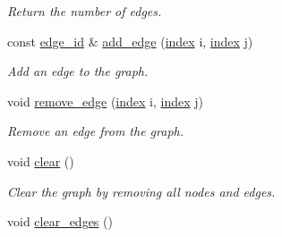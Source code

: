 \begin{DoxyCompactItemize}
\begin{DoxyCompactList}\small\item\em Return the number of edges. \end{DoxyCompactList}\item 
const \hyperlink{structmerlin_1_1edge__id}{edge\+\_\+id} \& \hyperlink{classmerlin_1_1graph_abb6ac50bdc67b24c70ac9cb896475350}{add\+\_\+edge} (\hyperlink{classmerlin_1_1graph_a5cade38832f47248573e921276f122d6}{index} i, \hyperlink{classmerlin_1_1graph_a5cade38832f47248573e921276f122d6}{index} j)
\begin{DoxyCompactList}\small\item\em Add an edge to the graph. \end{DoxyCompactList}\item 
void \hyperlink{classmerlin_1_1graph_a1d17b17fbf5b8378c1d65b885e688897}{remove\+\_\+edge} (\hyperlink{classmerlin_1_1graph_a5cade38832f47248573e921276f122d6}{index} i, \hyperlink{classmerlin_1_1graph_a5cade38832f47248573e921276f122d6}{index} j)
\begin{DoxyCompactList}\small\item\em Remove an edge from the graph. \end{DoxyCompactList}\item 
\hypertarget{classmerlin_1_1graph_a1971a84f3b1b32af0a4eeff502c491e3}{}void \hyperlink{classmerlin_1_1graph_a1971a84f3b1b32af0a4eeff502c491e3}{clear} ()\label{classmerlin_1_1graph_a1971a84f3b1b32af0a4eeff502c491e3}

\begin{DoxyCompactList}\small\item\em Clear the graph by removing all nodes and edges. \end{DoxyCompactList}\item 
\hypertarget{classmerlin_1_1graph_a1c405b536daed8d6f4f4ca49b0e93834}{}void \hyperlink{classmerlin_1_1graph_a1c405b536daed8d6f4f4ca49b0e93834}{clear\+\_\+edges} ()\label{classmerlin_1_1graph_a1c405b536daed8d6f4f4ca49b0e93834}


\end{DoxyCompactItemize}
